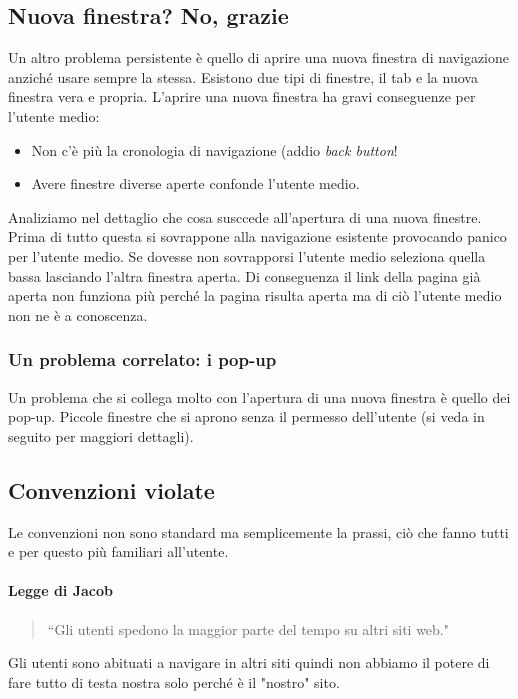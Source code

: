 		\subsection{Nuova finestra? No, grazie}
			Un altro problema persistente è quello di aprire una nuova finestra di navigazione anziché usare sempre la stessa.  Esistono due tipi di finestre, il tab e la nuova finestra vera e propria. L'aprire una nuova finestra ha gravi conseguenze per l'utente medio:
			\begin{itemize}
				\item Non c'è più la cronologia di navigazione (addio \emph{back button}!
				\item Avere finestre diverse aperte confonde l'utente medio.
			\end{itemize}
			Analiziamo nel dettaglio che cosa susccede all'apertura di una nuova finestre. Prima di tutto questa si sovrappone alla navigazione esistente provocando panico per l'utente medio. Se dovesse non sovrapporsi l'utente medio seleziona quella bassa lasciando l'altra finestra aperta. Di conseguenza il link della pagina già aperta non funziona più perché la pagina risulta aperta ma di ciò l'utente medio non ne è a conoscenza.
			
			\subsubsection{Un problema correlato: i pop-up}
				Un problema che si collega molto con l'apertura di una nuova finestra è quello dei pop-up. Piccole finestre che si aprono senza il permesso dell'utente (si veda in seguito per maggiori dettagli).
		
		\subsection{Convenzioni violate}
			Le convenzioni non sono standard ma semplicemente la prassi, ciò che fanno tutti e per questo più familiari all'utente. 
			
			\paragraph{Legge di Jacob}
			\begin{quote}
				``Gli utenti spedono la maggior parte del tempo su altri siti web."
			\end{quote}
			Gli utenti sono abituati a navigare in altri siti quindi non abbiamo il potere di fare tutto di testa nostra solo perché è il "nostro" sito.
			
